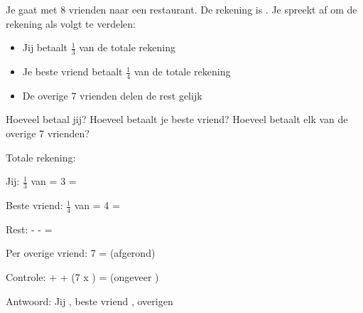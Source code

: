 \begin{opgave}
Je gaat met 8 vrienden naar een restaurant. De rekening is . 
Je spreekt af om de rekening als volgt te verdelen:

\begin{itemize}
\item Jij betaalt $\frac{1}{3}$ van de totale rekening
\item Je beste vriend betaalt $\frac{1}{4}$ van de totale rekening  
\item De overige 7 vrienden delen de rest gelijk
\end{itemize}

Hoeveel betaal jij? Hoeveel betaalt je beste vriend? Hoeveel betaalt elk van
de overige 7 vrienden?
\end{opgave}

\begin{oplossing}
Totale rekening: 

Jij: $\frac{1}{3}$ van  =  \textrm{\textdiv} 3 = 

Beste vriend: $\frac{1}{4}$ van  =  \textrm{\textdiv} 4 = 

Rest:  -  -  = 

Per overige vriend:  \textrm{\textdiv} 7 =  (afgerond)

Controle:  +  + (7 x ) =  (ongeveer )

Antwoord: Jij , beste vriend , overigen 
\end{oplossing}